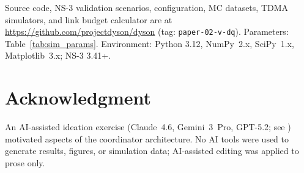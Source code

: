 \documentclass[journal]{IEEEtran}
\begin{document}
Source code, NS-3 validation scenarios, configuration, MC datasets, TDMA simulators, and link budget calculator are at \url{https://github.com/projectdyson/dyson} (tag: \texttt{paper-02-v-dq}). Parameters: Table~\ref{tab:sim_params}. Environment: Python 3.12, NumPy~2.x, SciPy~1.x, Matplotlib~3.x; NS-3 3.41+.

\section*{Acknowledgment}

An AI-assisted ideation exercise (Claude~4.6, Gemini~3~Pro, GPT-5.2; see \cite{dyson_multimodel}) motivated aspects of the coordinator architecture. No AI tools were used to generate results, figures, or simulation data; AI-assisted editing was applied to prose only.
\end{document}
